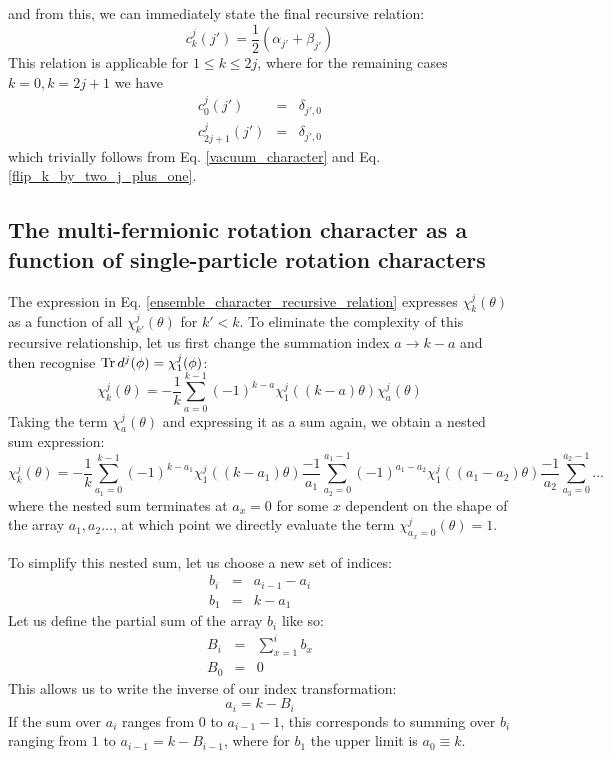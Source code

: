 \documentclass[12pt]{article}
\begin{document}
	and from this, we can immediately state the final recursive relation:
	\begin{equation}
	c^j_k(j') = \frac{1}{2}\left(\alpha_{j'}+\beta_{j'}\right)
	\end{equation}
	This relation is applicable for $1\leq k \leq 2j$, where for the remaining cases $k=0, k=2j+1$ we have
	\begin{eqnarray*}
	c^j_{0}(j') &=& \delta_{j', 0}\\
	c^j_{2j+1}(j') &=& \delta_{j', 0}
	\end{eqnarray*}
	which trivially follows from Eq. \ref{vacuum_character} and Eq. \ref{flip_k_by_two_j_plus_one}.
	
	
	\subsection{The multi-fermionic rotation character as a function of single-particle rotation characters}
	The expression in Eq. \ref{ensemble_character_recursive_relation} expresses $\chi^j_k(\theta)$ as a function of all $\chi^j_{k'}(\theta)$ for $k'<k$. To eliminate the complexity of this recursive relationship, let us first change the summation index $a\rightarrow k-a$ and then recognise $\Tr d^j(\phi)=\chi^j_1(\phi)$:
	\begin{equation}
	\chi^j_k(\theta)=-\frac{1}{k}\sum_{a=0}^{k-1} (-1)^{k-a}\chi^j_1((k-a)\theta)\chi^j_{a}(\theta)
	\end{equation}
	Taking the term $\chi^j_{a}(\theta)$ and expressing it as a sum again, we obtain a nested sum expression:
	\begin{equation} \label{nested_sum_a}
	\chi^j_k(\theta)=-\frac{1}{k}\sum_{a_1=0}^{k-1} (-1)^{k-a_1}\chi^j_1((k-a_1)\theta)\frac{-1}{a_1}\sum_{a_2=0}^{a_1-1} (-1)^{a_1-a_2}\chi^j_1((a_1-a_2)\theta)\frac{-1}{a_2}\sum_{a_3=0}^{a_2-1}\dots
	\end{equation}
	where the nested sum terminates at $a_x=0$ for some $x$ dependent on the shape of the array $a_1, a_2\dots$, at which point we directly evaluate the term $\chi^j_{a_x=0}(\theta)=1$.
	
	To simplify this nested sum, let us choose a new set of indices:
	\begin{eqnarray}
	b_i &=& a_{i-1} - a_i\\
	b_1 &=& k - a_1
	\end{eqnarray}
	Let us define the partial sum of the array $b_i$ like so:
	\begin{eqnarray}
	B_i &=& \sum_{x=1}^i b_x\\
	B_0 &=& 0
	\end{eqnarray}
	This allows us to write the inverse of our index transformation:
	\begin{equation}
	a_i = k - B_i
	\end{equation}
	If the sum over $a_i$ ranges from $0$ to $a_{i-1}-1$, this corresponds to summing over $b_i$ ranging from $1$ to $a_{i-1}=k-B_{i-1}$, where for $b_1$ the upper limit is $a_0\equiv k$.
	
\end{document}
